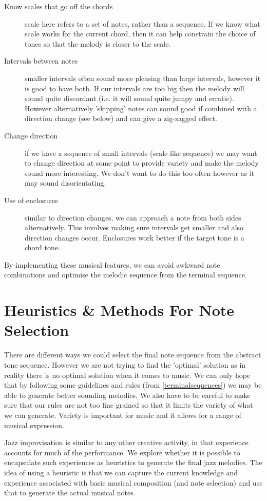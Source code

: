 \documentclass[pdftex,12pt,a4paper]{report}
\begin{document}
\begin{description}
  \item[Know scales that go off the chords] scale here refers to a set of notes, rather than a sequence. If we know what scale works for the current chord, then it can help constrain the choice of tones so that the melody is closer to the scale.
  \item[Intervals between notes] smaller intervals often sound more pleasing than large intervals, however it is good to have both. If our intervals are too big then the melody will sound quite discordant (i.e. it will sound quite jumpy and erratic). However alternatively 'skipping' notes can sound good if combined with a direction change (see below) and can give a zig-zagged effect.
  \item[Change direction] if we have a sequence of small intervals (scale-like sequence) we may want to change direction at some point to provide variety and make the melody sound more interesting. We don't want to do this too often however as it may sound disorientating.
  \item[Use of enclosures] similar to direction changes, we can approach a note from both sides alternatively. This involves making sure intervals get smaller and also direction changes occur. Enclosures work better if the target tone is a chord tone.
\end{description}

By implementing these musical features, we can avoid awkward note combinations and optimise the melodic sequence from the terminal sequence.


\section{Heuristics \& Methods For Note Selection}
There are different ways we could select the final note sequence from the abstract tone sequence. However we are not trying to find the 'optimal' solution as in reality there is no optimal solution when it comes to music. We can only hope that by following some guidelines and rules (from \ref{terminalsequences}) we may be able to generate better sounding melodies. We also have to be careful to make sure that our rules are not too fine grained so that it limits the variety of what we can generate. Variety is important for music and it allows for a range of musical expression.

Jazz improvisation is similar to any other creative activity, in that experience accounts for much of the performance. We explore whether it is possible to encapsulate such experiences as heuristics to generate the final jazz melodies. The idea of using a heuristic is that we can capture the current knowledge and experience associated with basic musical composition (and note selection) and use that to generate the actual musical notes. 
\end{document}
